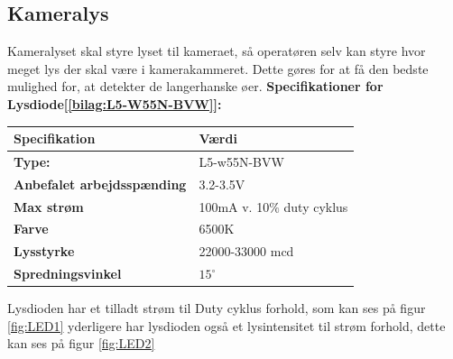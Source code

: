 \subsection{Kameralys}
Kameralyset skal styre lyset til kameraet, så operatøren selv kan styre hvor meget lys der skal være i kamerakammeret. Dette gøres for at få den bedste mulighed for, at detekter de langerhanske øer.
\textbf{Specifikationer for Lysdiode[\ref{bilag:L5-W55N-BVW}]:} 
\begin{center}
		\begin{longtable}{ | m{6.5cm} | m{6.5cm}| } 
			\hline
			\textbf{Specifikation} &\textbf{Værdi} \\ 
			\hline
			\textbf{Type:} & L5-w55N-BVW \\ 
			\hline
			\textbf{Anbefalet arbejdsspænding} & 3.2-3.5V \\ 
			\hline
			\textbf{Max strøm} & 100mA v. 10$\%$ duty cyklus \\ 
			\hline
			\textbf{Farve} & 6500K \\ 
			\hline
			\textbf{Lysstyrke} & 22000-33000 mcd \\ 
			\hline
			\textbf{Spredningsvinkel} & $15^{\circ}$ \\ 
			\hline
		\end{longtable}
\end{center}

Lysdioden har et tilladt strøm til Duty cyklus forhold, som kan ses på figur \ref{fig:LED1} yderligere har lysdioden også et lysintensitet til strøm forhold, dette kan ses på figur \ref{fig:LED2} 

